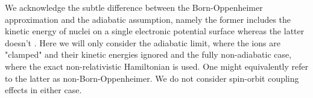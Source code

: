We acknowledge the subtle difference between the Born-Oppenheimer approximation and the adiabatic assumption, namely the former includes the kinetic energy of nuclei on a single electronic potential surface whereas the latter doesn't \cite{Cederbaum_BO}. Here we will only consider the adiabatic limit, where the ions are "clamped" and their kinetic energies ignored and the fully non-adiabatic case, where the exact non-relativistic Hamiltonian is used. One might equivalently refer to the latter as non-Born-Oppenheimer. We do not consider spin-orbit coupling effects in either case.